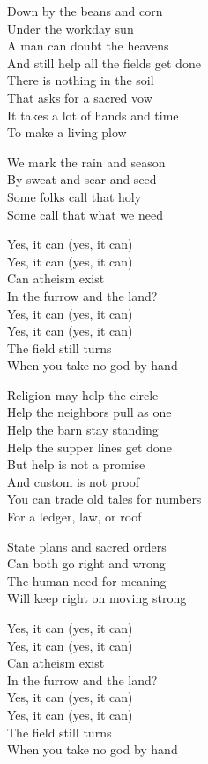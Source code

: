 \begin{lyrics}
Down by the beans and corn\\
Under the workday sun\\
A man can doubt the heavens\\
And still help all the fields get done\\
There is nothing in the soil\\
That asks for a sacred vow\\
It takes a lot of hands and time\\
To make a living plow

We mark the rain and season\\
By sweat and scar and seed\\
Some folks call that holy\\
Some call that what we need

Yes, it can (yes, it can)\\
Yes, it can (yes, it can)\\
Can atheism exist\\
In the furrow and the land?\\
Yes, it can (yes, it can)\\
Yes, it can (yes, it can)\\
The field still turns\\
When you take no god by hand

Religion may help the circle\\
Help the neighbors pull as one\\
Help the barn stay standing\\
Help the supper lines get done\\
But help is not a promise\\
And custom is not proof\\
You can trade old tales for numbers\\
For a ledger, law, or roof

State plans and sacred orders\\
Can both go right and wrong\\
The human need for meaning\\
Will keep right on moving strong

Yes, it can (yes, it can)\\
Yes, it can (yes, it can)\\
Can atheism exist\\
In the furrow and the land?\\
Yes, it can (yes, it can)\\
Yes, it can (yes, it can)\\
The field still turns\\
When you take no god by hand


\end{lyrics}
